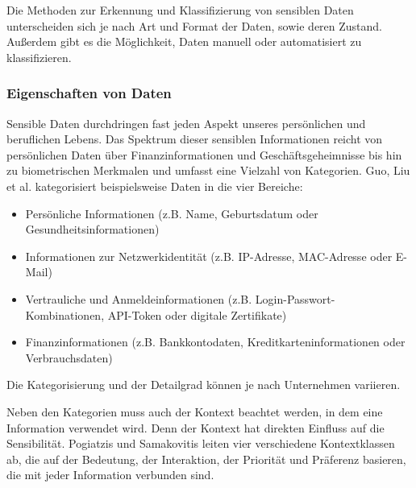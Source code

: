 Die Methoden zur Erkennung und Klassifizierung von sensiblen Daten unterscheiden sich je nach Art und Format der Daten, sowie deren Zustand. Außerdem gibt es die Möglichkeit, Daten manuell oder automatisiert zu klassifizieren.

\subsubsection{Eigenschaften von Daten}
Sensible Daten durchdringen fast jeden Aspekt unseres persönlichen und beruflichen Lebens. Das Spektrum dieser sensiblen Informationen reicht von persönlichen Daten über Finanzinformationen und Geschäftsgeheimnisse bis hin zu biometrischen Merkmalen und umfasst eine Vielzahl von Kategorien. Guo, Liu et al. \cite{Guo.2021} kategorisiert beispielsweise Daten in die vier Bereiche:
\begin{itemize}
    \item Persönliche Informationen (z.B. Name, Geburtsdatum oder Gesundheitsinformationen)
    \item Informationen zur Netzwerkidentität (z.B. IP-Adresse, MAC-Adresse oder E-Mail)
    \item Vertrauliche und Anmeldeinformationen (z.B. Login-Passwort-Kombinationen, API-Token oder digitale Zertifikate)
    \item Finanzinformationen (z.B. Bankkontodaten, Kreditkarteninformationen oder Verbrauchsdaten)
\end{itemize}
Die Kategorisierung und der Detailgrad können je nach Unternehmen variieren.

Neben den Kategorien muss auch der Kontext beachtet werden, in dem eine Information verwendet wird. Denn der Kontext hat direkten Einfluss auf die Sensibilität. Pogiatzis und Samakovitis \cite{Pogiatzis.2020} leiten vier verschiedene Kontextklassen ab, die auf der Bedeutung, der Interaktion, der Priorität und Präferenz basieren, die mit jeder Information verbunden sind.

